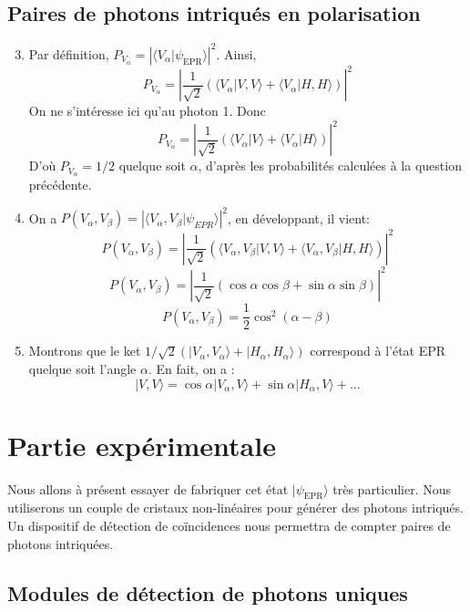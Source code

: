 \documentclass[twocolumn, 10pt]{article}
\newcommand{\ket}[1]{\ensuremath{|#1\rangle}\xspace}
\newcommand{\psh}[2]{\ensuremath{\langle #1|#2\rangle}\xspace}
\newcommand{\epr}[0]{\psi_{\scriptscriptstyle \mathrm{EPR}}}
\begin{document}
\subsection{Paires de photons intriqués en polarisation}

\begin{enumerate}
\setcounter{enumi}{2}
    \item Par définition, $P_{V_{\alpha}} = | \psh{V_{\alpha}}{\epr} |^2$. Ainsi, 
\[P_{V_{\alpha}} = \left|\frac{1}{\sqrt{2}} ( \psh{V_{\alpha}}{V,V} + \psh{V_{\alpha}}{H,H} ) \right|^2 \]
On ne s'intéresse ici qu'au photon \no{}1. Donc 
\[P_{V_{\alpha}} = \left|\frac{1}{\sqrt{2}} ( \psh{V_{\alpha}}{V} + \psh{V_{\alpha}}{H} ) \right|^2 \]
D'où $P_{V_{\alpha}} = 1/2$ quelque soit $\alpha$, d'après les probabilités calculées à la question précédente.

    \item On a $P(V_{\alpha}, V_{\beta}) = | \psh{V_{\alpha}, V_{\beta}}{\psi_{\textstyle EPR}} |^2$, en développant, il vient:
\[P(V_{\alpha}, V_{\beta}) =  \left|\frac{1}{\sqrt{2}} ( \psh{V_{\alpha}, V_{\beta}}{V,V} + \psh{V_{\alpha}, V_{\beta}}{H,H} ) \right|^2 \]
\[P(V_{\alpha}, V_{\beta}) =  \left|\frac{1}{\sqrt{2}} ( \cos{\alpha} \cos {\beta} + \sin{\alpha} \sin{\beta} ) \right|^2 \]
\[P(V_{\alpha}, V_{\beta}) =  \frac{1}{2} \cos^2(\alpha - \beta) \]

    \item Montrons que le ket $ 1/\sqrt{2} (\ket{V_{\alpha}, V_{\alpha}} + \ket{H_{\alpha}, H_{\alpha}})$ correspond à l'état EPR quelque soit l'angle $\alpha$. En fait, on a :
\[\ket{V,V} = \cos{\alpha} \ket{V_{\alpha},V} +  \sin{\alpha} \ket{H_{\alpha},V} +...\]


\end{enumerate}


\section{Partie expérimentale}

\par Nous allons à présent essayer de fabriquer cet état $\ket{\epr}$ très particulier. Nous utiliserons un couple de cristaux non-linéaires pour générer des photons intriqués. Un dispositif de détection de coïncidences nous permettra de compter paires de photons intriquées.

\subsection{Modules de détection de photons uniques}
\end{document}
